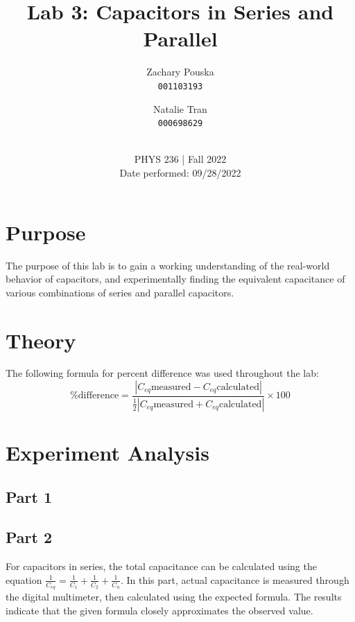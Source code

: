 \documentclass[titlepage]{article}
\begin{document}
\title{\textbf{Lab 3: Capacitors in Series and Parallel}}
\author{
    Zachary Pouska\\
    \texttt{001103193}\\
    \and
    Natalie Tran \\ 
    \texttt{000698629}\\ \\
} 

\date{PHYS 236 | Fall 2022\\
Date performed: 09/28/2022}


	\maketitle



	\section{Purpose}
    The purpose of this lab is to gain a working understanding of the real-world behavior of capacitors, and experimentally finding the equivalent capacitance of various combinations of series and parallel capacitors.

	\section{Theory}	

    The following formula for percent difference was used throughout the lab: $$\text{\% difference} = \frac{|C_{eq}\text{measured} - C_{eq}\text{calculated} |}{\frac{1}{2} |C_{eq}\text{measured} + C_{eq}\text{calculated}|} \times 100$$



	\section{Experiment Analysis}
   	\subsection{Part 1} 
   	\subsection{Part 2} 
	For capacitors in series, the total capacitance can be calculated using the equation $\frac{1}{C_{eq}} = \frac{1}{C_1} + \frac{1}{C_2} + \frac{1}{C_n}$. In this part, actual capacitance is measured through the digital multimeter, then calculated using the expected formula. The results indicate that the given formula closely approximates the observed value. 
\end{document}
